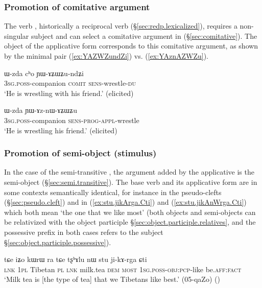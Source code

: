 \subsubsection{Promotion of comitative argument} \label{sec:applicative.comitative}
The verb , historically a reciprocal verb (§\ref{sec:redp.lexicalized}), requires a non-singular subject and can select a comitative argument in  (§\ref{sec:comitative}). The object of the applicative form  corresponds to this comitative argument, as shown by the minimal pair (\ref{ex:YAZWZundZi}) vs. (\ref{ex:YAznAZWZu}).

\begin{exe}
\ex \label{ex:YAZWZundZi}
\gll ɯ-zda cʰo ɲɯ-ɤʑɯʑu-ndʑi \\
\textsc{3sg}.\textsc{poss}-companion \textsc{comit} \textsc{sens}-wrestle-\textsc{du}  \\
\glt `He is wrestling with his friend.' (elicited)
\end{exe}

\begin{exe}
\ex \label{ex:YAznAZWZu}
\gll ɯ-zda ɲɯ-ɤz-nɯ-ɤʑɯʑu \\
\textsc{3sg}.\textsc{poss}-companion \textsc{sens}-\textsc{prog}-\textsc{appl}-wrestle \\
\glt `He is wrestling his friend.' (elicited)
\end{exe}

\subsubsection{Promotion of semi-object (stimulus)} \label{sec:applicative.semi.object}
In the case of the semi-transitive , the argument added by the applicative is the semi-object (§\ref{sec:semi.transitive}). The base verb  and its applicative form  are in some contexts semantically identical, for instance in the pseudo-clefts  (§\ref{sec:pseudo.cleft})  and  in (\ref{ex:stu.jikArga.Cti}) and (\ref{ex:stu.jikAnWrga.Cti}) which both mean `the one that we like most' (both objects and semi-objects can be relativized with the object participle §\ref{sec:object.participle.relatives}, and the possessive prefix in both cases refers to the subject §\ref{sec:object.participle.possessive}).


\begin{exe}
\ex \label{ex:stu.jikArga.Cti}
\gll tɕe iʑo kɯrɯ ra tɕe tʂʰɤlu nɯ stu ji-kɤ-rga ɕti \\
\textsc{lnk} \textsc{1pl} Tibetan \textsc{pl} \textsc{lnk} milk.tea \textsc{dem} \textsc{most} \textsc{1sg}.\textsc{poss}-\textsc{obj}:\textsc{pcp}-like be.\textsc{aff}:\textsc{fact} \\
\glt `Milk tea is [the type of tea] that we Tibetans like best.' (05-qaZo)
()
\end{exe}

